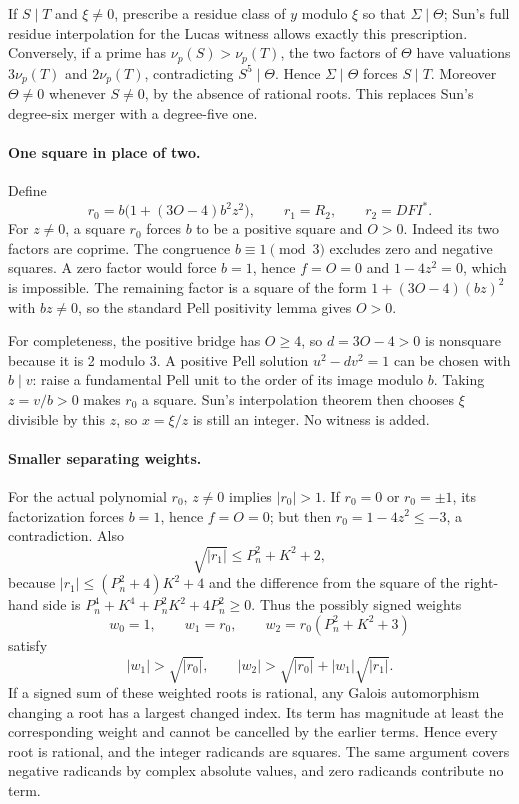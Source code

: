 If $S\mid T$ and $\xi\ne0$, prescribe a residue class of $y$ modulo $\xi$
so that $\Sigma\mid\Theta$; Sun's full residue interpolation for the Lucas
witness allows exactly this prescription.  Conversely, if a prime has
$\nu_p(S)>\nu_p(T)$, the two factors of $\Theta$ have valuations
$3\nu_p(T)$ and $2\nu_p(T)$, contradicting $S^5\mid\Theta$.  Hence
$\Sigma\mid\Theta$ forces $S\mid T$.  Moreover $\Theta\ne0$ whenever
$S\ne0$, by the absence of rational roots.  This replaces Sun's degree-six
merger with a degree-five one.

\paragraph{One square in place of two.}
Define
\[
 r_0=b\bigl(1+(3O-4)b^2z^2\bigr),\qquad
 r_1=R_2,\qquad r_2=DFI^*.
\]
For $z\ne0$, a square $r_0$ forces $b$ to be a positive square and
$O>0$.  Indeed its two factors are coprime.  The congruence
$b\equiv1\pmod3$ excludes zero and negative squares.  A zero factor would
force $b=1$, hence $f=O=0$ and $1-4z^2=0$, which is impossible.
The remaining factor is a
square of the form $1+(3O-4)(bz)^2$ with $bz\ne0$, so the standard Pell
positivity lemma gives $O>0$.

For completeness, the positive bridge has $O\ge4$, so $d=3O-4>0$ is
nonsquare because it is 2 modulo 3.  A positive Pell solution
$u^2-dv^2=1$ can be chosen with $b\mid v$: raise a fundamental Pell unit
to the order of its image modulo $b$.  Taking $z=v/b>0$ makes $r_0$ a
square.  Sun's interpolation theorem then chooses $\xi$ divisible by
this $z$, so $x=\xi/z$ is still an integer.  No witness is added.

\paragraph{Smaller separating weights.}
For the actual polynomial $r_0$, $z\ne0$ implies $|r_0|>1$.  If $r_0=0$
or $r_0=\pm1$, its factorization forces $b=1$, hence $f=O=0$; but then
$r_0=1-4z^2\le-3$, a contradiction.  Also
\[
 \sqrt{|r_1|}\le P_n^2+K^2+2,
\]
because $|r_1|\le(P_n^2+4)K^2+4$ and the difference from the square of
the right-hand side is
$P_n^4+K^4+P_n^2K^2+4P_n^2\ge0$.
Thus the possibly signed weights
\[
 w_0=1,\qquad w_1=r_0,\qquad w_2=r_0(P_n^2+K^2+3)
\]
satisfy
\[
 |w_1|>\sqrt{|r_0|},\qquad
 |w_2|>\sqrt{|r_0|}+|w_1|\sqrt{|r_1|}.
\]
If a signed sum of these weighted roots is rational, any Galois
automorphism changing a root has a largest changed index.  Its term has
magnitude at least the corresponding weight and cannot be cancelled by
the earlier terms.  Hence every root is rational, and the integer
radicands are squares.  The same argument covers negative radicands by
complex absolute values, and zero radicands contribute no term.

